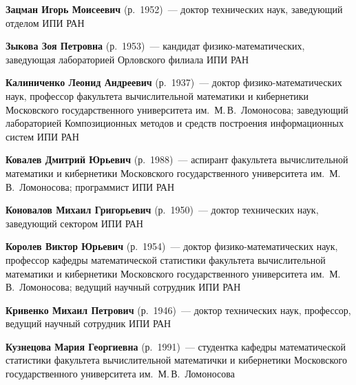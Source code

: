 \begin{multicols}{2}
\vspace*{3pt}

\noindent 
\textbf{Зацман Игорь Моисеевич} (р.\ 1952)~--- доктор технических наук, заведующий отделом 
ИПИ РАН

\vspace*{3pt}
 
\noindent 
\textbf{Зыкова Зоя Петровна} (р.\ 1953)~--- кандидат фи\-зи\-ко-ма\-те\-ма\-ти\-че\-ских, заведующая 
лабораторией Орловского филиала ИПИ РАН 

\vspace*{3pt}

\noindent
\textbf{Калиниченко Леонид Андреевич} (р.\ 1937)~--- доктор фи\-зи\-ко-ма\-те\-ма\-ти\-че\-ских
наук, профессор факультета вычислительной математики и кибернетики Московского 
государственного университета им.\ М.\,В.~Ломоносова; 
заведующий лабораторией Композиционных методов и средств построения информационных систем 
ИПИ РАН

\vspace*{3pt}

\noindent
\textbf{Ковалев Дмитрий Юрьевич} (р.\ 1988)~--- аспирант факультета 
вычислительной математики и кибернетики Московского 
государственного университета им.\ М.\,В.~Ломоносова; программист ИПИ РАН



\vspace*{3pt}

\noindent 
\textbf{Коновалов Михаил Григорьевич} (р.\ 1950)~--- доктор технических наук, заведующий 
сектором ИПИ РАН

\vspace*{3pt}

\noindent 
\textbf{Королев Виктор Юрьевич} (р.\ 1954)~--- доктор фи\-зико-матема\-ти\-че\-ских 
наук, профессор 
кафедры математической статистики факультета вычислительной математики и 
кибернетики Московского государственного университета им.\ М.\,В.~Ломоносова; 
ведущий научный сотрудник ИПИ РАН

\vspace*{3pt}

\noindent 
\textbf{Кривенко Михаил Петрович} (р.\ 1946)~--- доктор 
технических наук, профессор, ведущий научный сотрудник ИПИ РАН 

\vspace*{3pt}

\noindent 
\textbf{Кузнецова Мария Георгиевна} (р.\ 1991)~--- студентка кафедры математической 
статистики факультета вычислительной математички и кибернетики Московского 
государственного университета им.\ М.\,В.~Ломоносова


\end{multicols}
